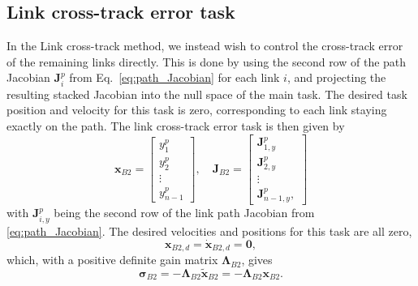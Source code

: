 \documentclass[../main.tex]{subfiles}
\begin{document}
\subsection{Link cross-track error task}
\label{sec:link_cross}
In the Link cross-track method, we instead wish to control the cross-track error of the remaining links directly. This is done by using the second row of the path Jacobian $\bm{J}_i^p$ from Eq.~\eqref{eq:path_Jacobian} for each link $i$, and projecting the resulting stacked Jacobian into the null space of the main task. The desired task position and velocity for this task is zero, corresponding to each link staying exactly on the path. The link cross-track error task is then given by
\begin{equation}
    \label{eq:link_cross}
    \bm{x}_{B2} = \begin{bmatrix}
        y^p_1 \\ y^p_2 \\ \vdots \\ y^p_{n-1}
    \end{bmatrix}, \quad
    \bm{J}_{B2} = \begin{bmatrix}
        \bm{J}^p_{1, y} \\ \bm{J}^p_{2, y} \\ \vdots \\ \bm{J}^p_{n-1, y},
    \end{bmatrix}
\end{equation}
with $\bm{J}^p_{i, y}$ being the second row of the link path Jacobian from \eqref{eq:path_Jacobian}. The desired velocities and positions for this task are all zero,
\begin{equation}
    \bm{x}_{B2,d} = \dot{\bm{x}}_{B2,d} = \bm{0},
\end{equation}
which, with a positive definite gain matrix $\bm{\Lambda}_{B2}$, gives
\begin{equation}
    \label{eq:sigma_linkcross}
    \bm{\sigma}_{B2} = -\bm{\Lambda}_{B2} \tilde{\bm{x}}_{B2} = -\bm{\Lambda}_{B2} \bm{x}_{B2}.
\end{equation}
\end{document}
